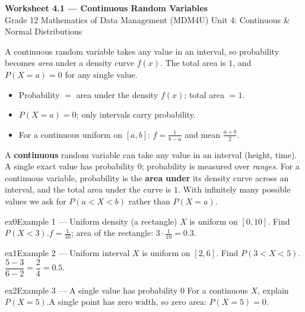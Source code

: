 \documentclass[11pt]{article}
\begin{document}
\begin{center}
{\LARGE\bfseries\color{titleblue}Worksheet 4.1 --- Continuous Random Variables}\\[2pt]
{\small Grade 12 Mathematics of Data Management (MDM4U) \textperiodcentered{} Unit 4: Continuous \& Normal Distributions}
\end{center}

\begin{ideabox}
A continuous random variable takes any value in an interval, so probability becomes \emph{area} under a density curve $f(x)$. The total area is $1$, and $P(X=a)=0$ for any single value.
\begin{itemize}[leftmargin=*,itemsep=2pt]
  \item Probability $=$ area under the density $f(x)$; total area $=1$.
  \item $P(X=a)=0$; only intervals carry probability.
  \item For a continuous uniform on $[a,b]$: $f=\tfrac{1}{b-a}$ and mean $\tfrac{a+b}{2}$.
\end{itemize}
\end{ideabox}

\begin{learnbox}
A \textbf{continuous} random variable can take any value in an interval (height, time). A single exact value has probability $0$; probability is measured over \emph{ranges}.
For a continuous variable, probability is the \textbf{area under} its density curve across an interval, and the total area under the curve is $1$.
With infinitely many possible values we ask for $P(a<X<b)$ rather than $P(X=a)$.
\end{learnbox}


\begin{example}{ex0}{Example 1 --- Uniform density (a rectangle)}
$X$ is uniform on $[0,10]$. Find $P(X<3)$.\soln $f=\tfrac{1}{10}$; area of the rectangle: $3\cdot\tfrac{1}{10}=0.3$.
\end{example}

\begin{example}{ex1}{Example 2 --- Uniform interval}
$X$ is uniform on $[2,6]$. Find $P(3<X<5)$.\soln $\dfrac{5-3}{6-2}=\dfrac24=0.5$.
\end{example}

\begin{example}{ex2}{Example 3 --- A single value has probability 0}
For a continuous $X$, explain $P(X=5)$.\soln A single point has zero width, so zero area: $P(X=5)=0$.
\end{example}
\end{document}
